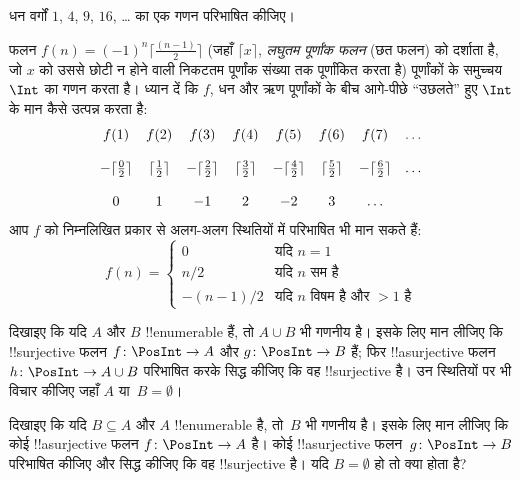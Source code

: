 \documentclass[../../../include/open-logic-section]{subfiles}
\begin{document}
\begin{prob}
धन वर्गों $1$, $4$, $9$, $16$, \dots{} का एक गणन परिभाषित कीजिए।
\end{prob}

\begin{ex}
फलन $f(n) = (-1)^{n} \lceil \frac{(n-1)}{2}\rceil$ (जहाँ
$\lceil x \rceil$, \emph{लघुतम पूर्णांक फलन} (छत फलन) को दर्शाता है, जो
$x$ को उससे छोटी न होने वाली निकटतम पूर्णांक संख्या तक पूर्णांकित करता है)
पूर्णांकों के समुच्चय~$\Int$ का गणन करता है। ध्यान दें कि $f$, धन और ऋण
पूर्णांकों के बीच आगे-पीछे ``उछलते'' हुए $\Int$ के मान कैसे उत्पन्न करता है:
\[
\begin{array}{c c c c c c c c}
f(1) & f(2) & f(3) & f(4) & f(5) & f(6) & f(7) & \dots \\ \\
- \lceil \tfrac{0}{2} \rceil & \lceil \tfrac{1}{2}\rceil & - \lceil \tfrac{2}{2} \rceil & \lceil \tfrac{3}{2} \rceil & - \lceil \tfrac{4}{2} \rceil  & \lceil \tfrac{5}{2}
\rceil & - \lceil \tfrac{6}{2} \rceil & \dots \\ \\
0 & 1 & -1 & 2 & -2 & 3 & \dots
\end{array}
\]
आप $f$ को निम्नलिखित प्रकार से अलग-अलग स्थितियों में परिभाषित भी मान सकते हैं:
\[
f(n) = \begin{cases}
  0 & \text{यदि $n = 1$}\\
  n/2 & \text{यदि $n$ सम है}\\
  -(n-1)/2 & \text{यदि $n$ विषम है और $>1$ है}
  \end{cases}
\]
\end{ex}

\begin{prob}
  दिखाइए कि यदि $A$ और $B$ !!{enumerable} हैं, तो $A \cup B$ भी गणनीय है।
  इसके लिए मान लीजिए कि !!{surjective} फलन $f\colon \PosInt \to
  A$ और $g\colon \PosInt \to B$ हैं; फिर !!a{surjective}
  फलन~$h\colon \PosInt \to A \cup B$ परिभाषित करके सिद्ध कीजिए कि वह
  !!{surjective} है। उन स्थितियों पर भी विचार कीजिए जहाँ $A$ या~$B = \emptyset$।
\end{prob}
  
\begin{prob}
  दिखाइए कि यदि $B \subseteq A$ और $A$ !!{enumerable} है, तो~$B$ भी गणनीय
  है। इसके लिए मान लीजिए कि कोई !!a{surjective} फलन $f\colon \PosInt \to
  A$ है। कोई !!a{surjective} फलन~$g\colon \PosInt \to B$ परिभाषित कीजिए
  और सिद्ध कीजिए कि वह !!{surjective} है। यदि $B = \emptyset$ हो तो क्या
  होता है?
\end{prob}
    
\end{document}
